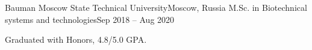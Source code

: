 \resumeSubheading
{Bauman Moscow State Technical University}{Moscow, Russia}
{M.Sc. in Biotechnical systems and technologies}{Sep 2018 -- Aug 2020}
\begin{itemize}[leftmargin=0in, label={}]
    \small{\item{
        {Graduated with Honors, 4.8/5.0 GPA.}\\
    }}
    \end{itemize}